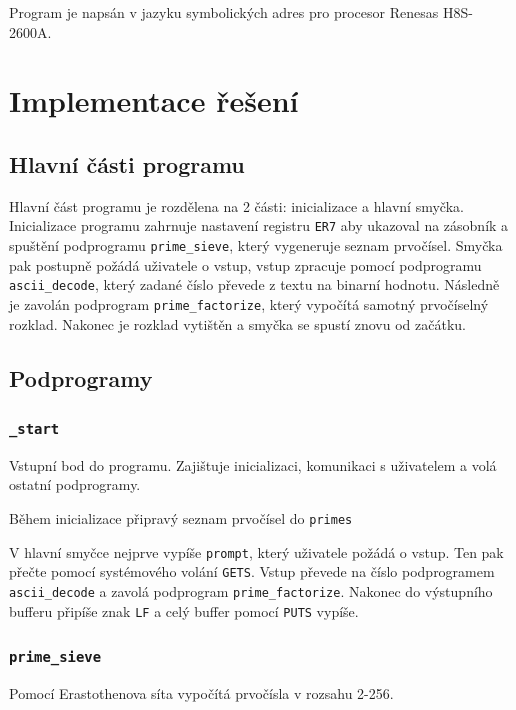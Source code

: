 \documentclass[12pt]{article}
\newcommand{\code}[1]{\mbox{\texttt{#1}}}
\begin{document}
Program je napsán v jazyku symbolických adres pro procesor Renesas H8S-2600A.

\section{Implementace řešení}

\subsection{Hlavní části programu}

Hlavní část programu je rozdělena na 2 části: inicializace a hlavní smyčka.
Inicializace programu zahrnuje nastavení registru \code{ER7} aby ukazoval na
zásobník a spuštění podprogramu \code{prime\_sieve}, který vygeneruje seznam
prvočísel. Smyčka pak postupně požádá uživatele o vstup, vstup zpracuje pomocí
podprogramu \code{ascii\_decode}, který zadané číslo převede z textu na binarní
hodnotu. Následně je zavolán podprogram \code{prime\_factorize}, který vypočítá
samotný prvočíselný rozklad. Nakonec je rozklad vytištěn a smyčka se spustí
znovu od začátku.

\subsection{Podprogramy}

\subsubsection{\code{\_start}}

Vstupní bod do programu. Zajištuje inicializaci, komunikaci s uživatelem a volá
ostatní podprogramy.

Během inicializace připravý seznam prvočísel do \code{primes}

V hlavní smyčce nejprve vypíše \code{prompt}, který uživatele požádá o vstup.
Ten pak přečte pomocí systémového volání \code{GETS}. Vstup převede na číslo
podprogramem \code{ascii\_decode} a zavolá podprogram \code{prime\_factorize}.
Nakonec do výstupního bufferu připíše znak \code{LF} a celý buffer pomocí
\code{PUTS} vypíše.

\subsubsection{\code{prime\_sieve}}

Pomocí Erastothenova síta vypočítá prvočísla v rozsahu 2-256.
\end{document}
